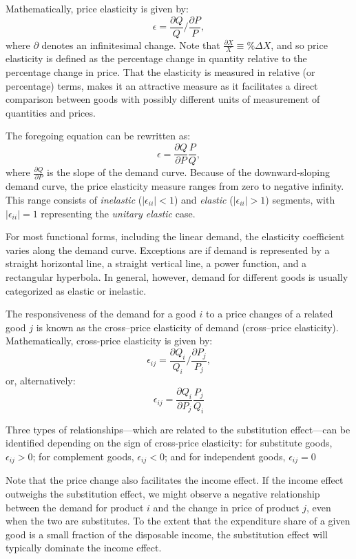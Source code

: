 \documentclass[
  oneside]{book}
\begin{document}
Mathematically, price elasticity is given by: \[\epsilon = \frac{\partial Q}{Q}/\frac{\partial P}{P},\] where \(\partial\) denotes an infinitesimal change. Note that \(\frac{\partial X}{X} \equiv \%\Delta X\), and so price elasticity is defined as the percentage change in quantity relative to the percentage change in price. That the elasticity is measured in relative (or percentage) terms, makes it an attractive measure as it facilitates a direct comparison between goods with possibly different units of measurement of quantities and prices.

The foregoing equation can be rewritten as: \[\epsilon = \frac{\partial Q}{\partial P}\frac{P}{Q},\] where \(\frac{\partial Q}{\partial P}\) is the slope of the demand curve. Because of the downward-sloping demand curve, the price elasticity measure ranges from zero to negative infinity. This range consists of \emph{inelastic} (\(|\epsilon_{ii}| < 1\)) and \emph{elastic} (\(|\epsilon_{ii}| > 1\)) segments, with \(|\epsilon_{ii}| = 1\) representing the \emph{unitary elastic} case.

For most functional forms, including the linear demand, the elasticity coefficient varies along the demand curve. Exceptions are if demand is represented by a straight horizontal line, a straight vertical line, a power function, and a rectangular hyperbola. In general, however, demand for different goods is usually categorized as elastic or inelastic.

The responsiveness of the demand for a good \(i\) to a price changes of a related good \(j\) is known as the cross--price elasticity of demand (cross--price elasticity). Mathematically, cross-price elasticity is given by: \[\epsilon_{ij} = \frac{\partial Q_i}{Q_i}/\frac{\partial P_j}{P_j},\] or, alternatively: \[\epsilon_{ij} = \frac{\partial Q_i}{\partial P_j}\frac{P_j}{Q_i}\]

Three types of relationships---which are related to the substitution effect---can be identified depending on the sign of cross-price elasticity: for substitute goods, \(\epsilon_{ij} > 0\); for complement goods, \(\epsilon_{ij} < 0\); and for independent goods, \(\epsilon_{ij} = 0\)

Note that the price change also facilitates the income effect. If the income effect outweighs the substitution effect, we might observe a negative relationship between the demand for product \(i\) and the change in price of product \(j\), even when the two are substitutes. To the extent that the expenditure share of a given good is a small fraction of the disposable income, the substitution effect will typically dominate the income effect.
\end{document}
